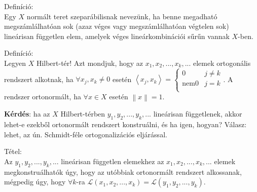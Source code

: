 \documentclass[12pt,a4paper]{scrartcl}
\newenvironment{definicio}{}{}
\newenvironment{tetel}{}{}
\begin{document}
\begin{definicio}

Definíció:\\
Egy \(X\) normált teret szeparábilisnak nevezünk, ha benne megadható
megszámlálhatóan sok (azaz véges vagy megszámlálhatóan végtelen sok)
lineárisan független elem, amelyek véges lineárkombinációi sűrűn vannak
\(X\)-ben.

\end{definicio}

\begin{definicio}

Definíció:\\
Legyen \(X\) Hilbert-tér! Azt mondjuk, hogy az
\(x_{1},x_{2},...,x_{k},...\) elemek ortogonális rendszert alkotnak, ha
\(\forall x_{j},x_{k} \neq 0\) esetén
\(\left\langle {x_{j},x_{k}} \right\rangle = \begin{cases} 0 & {j \neq k} \\ {\text{nem}0} & {j = k} \\ \end{cases}\).
A rendszer ortonormált, ha \(\forall x \in X\) esetén
\(\left\| x \right\| = 1\).

\end{definicio}

\textbf{Kérdés}: ha az \(X\) Hilbert-térben
\(y_{1},y_{2},...,y_{k},...\) lineárisan függetlenek, akkor lehet-e
ezekből ortonormált rendszert konstruálni, és ha igen, hogyan? Válasz:
lehet, az ún. Schmidt-féle ortogonalizációs eljárással.

\begin{tetel}

Tétel:\\
Az \(y_{1},y_{2},...,y_{k},...\) lineárisan független elemekhez az
\(x_{1},x_{2},...,x_{k},...\) elemek megkonstruálhatók úgy, hogy az
utóbbiak ortonormált rendszert alkossanak, mégpedig úgy, hogy
\(\forall k\)-ra
\(\mathcal{L}\left( {x_{1},x_{2},...,x_{k}} \right) = \mathcal{L}\left( {y_{1},y_{2},...,y_{k}} \right)\).

\end{tetel}
\end{document}
